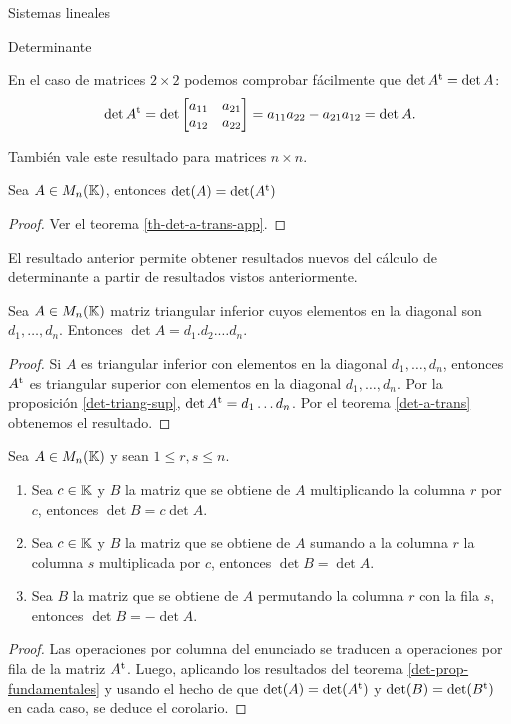 \begin{chapter}{Sistemas lineales}
\begin{section}{Determinante}
\begin{obs*}
    En  el caso  de matrices $2 \times 2$ podemos comprobar fácilmente que $\det A^{\operatorname{t}} = \det A$:
    $$
    \det A^{\operatorname{t}} = \det \begin{bmatrix} a_{11} & a_{21} \\ a_{12}& a_{22}\end{bmatrix} = 
    a_{11}a_{22} - a_{21}a_{12} = \det A. 
    $$
\end{obs*}

También vale este resultado para matrices $n \times n$.

\begin{teorema}\label{det-a-trans} Sea $A \in M_n(\mathbb K)$,  entonces 
    $\det(A) = \det(A^{\operatorname{t}})$
\end{teorema}
\begin{proof}
    Ver el teorema \ref{th-det-a-trans-app}.
\end{proof}
    
    El resultado anterior permite obtener resultados nuevos del cálculo de determinante a partir de resultados vistos anteriormente. 
    
    
    \begin{proposicion}\label{det-triang-inf}
    Sea $A \in M_n(\mathbb K)$ matriz triangular  inferior cuyos elementos en la diagonal son $d_1,\ldots,d_n$. Entonces $\det A = d_1.d_2.\ldots d_n$.
    \end{proposicion}
    \begin{proof}
        Si $A$ es triangular inferior con elementos en la diagonal $d_1,\ldots,d_n$,  entonces $A^{\operatorname{t}}$ es triangular superior con  elementos en la diagonal $d_1,\ldots,d_n$. Por la proposición \ref{det-triang-sup}, $\det A^{\operatorname{t}} = d_1\ldots d_n$. Por el teorema  \ref{det-a-trans} obtenemos el resultado. 
    \end{proof}


    
    \begin{teorema}\label{det-opr-col}
        Sea $A  \in M_n(\mathbb K)$ y sean $1 \le r,s \le n$.
        \begin{enumerate}
            \item Sea $c \in \mathbb K$ y $B$ la matriz que se obtiene de $A$ multiplicando la columna $r$ por $c$, entonces $\det B = c \det A$.
            \item  Sea $c \in \mathbb K$ y $B$ la matriz que se obtiene de $A$ sumando a la columna $r$ la columna $s$ multiplicada por $c$, entonces $\det B = \det A$.
            \item Sea $B$ la matriz que se obtiene de $A$ permutando la columna $r$ con la fila $s$, entonces $\det B = -\det A$.
        \end{enumerate}
    \end{teorema}
    \begin{proof}
        Las operaciones por columna del enunciado se traducen a operaciones por fila de la matriz $A^{\operatorname{t}}$. Luego, aplicando los resultados del teorema  \ref{det-prop-fundamentales} y usando el hecho de que $\det(A) = \det(A^{\operatorname{t}})$ y $\det(B) = \det(B^{\operatorname{t}})$ en cada caso, se deduce el corolario. 
    \end{proof}
    

\end{section}
\end{chapter}

